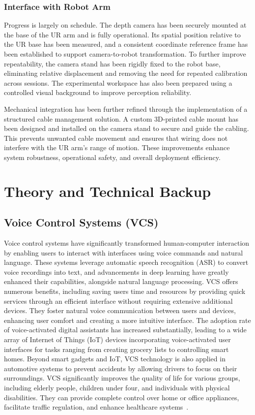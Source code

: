 \documentclass[12pt]{extarticle}
\begin{document}
\subsubsection{Interface with Robot Arm}

Progress is largely on schedule. The depth camera has been securely mounted at the base of the UR arm and is fully operational. Its spatial position relative to the UR base has been measured, and a consistent coordinate reference frame has been established to support camera-to-robot transformation. To further improve repeatability, the camera stand has been rigidly fixed to the robot base, eliminating relative displacement and removing the need for repeated calibration across sessions. The experimental workspace has also been prepared using a controlled visual background to improve perception reliability.

Mechanical integration has been further refined through the implementation of a structured cable management solution. A custom 3D-printed cable mount has been designed and installed on the camera stand to secure and guide the cabling. This prevents unwanted cable movement and ensures that wiring does not interfere with the UR arm’s range of motion. These improvements enhance system robustness, operational safety, and overall deployment efficiency.

\newpage
\section{Theory and Technical Backup}

\subsection{Voice Control Systems (VCS)}
Voice control systems have significantly transformed human-computer interaction by enabling users to interact with interfaces using voice commands and natural language. These systems leverage automatic speech recognition (ASR) to convert voice recordings into text, and advancements in deep learning have greatly enhanced their capabilities, alongside natural language processing. VCS offers numerous benefits, including saving users time and resources by providing quick services through an efficient interface without requiring extensive additional devices. They foster natural voice communication between users and devices, enhancing user comfort and creating a more intuitive interface. The adoption rate of voice-activated digital assistants has increased substantially, leading to a wide array of Internet of Things (IoT) devices incorporating voice-activated user interfaces for tasks ranging from creating grocery lists to controlling smart homes. Beyond smart gadgets and IoT, VCS technology is also applied in automotive systems to prevent accidents by allowing drivers to focus on their surroundings. VCS significantly improves the quality of life for various groups, including elderly people, children under four, and individuals with physical disabilities. They can provide complete control over home or office appliances, facilitate traffic regulation, and enhance healthcare systems~\cite{vcs}.
\end{document}
